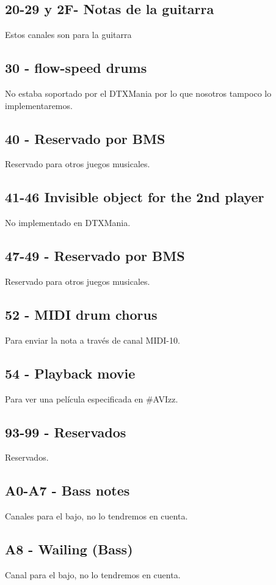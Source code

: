 \documentclass[a4paper,11pt,oneside]{book}
\begin{document}
\subsection{20-29 y 2F- Notas de la guitarra}
Estos canales son para la guitarra

\subsection{30 - flow-speed drums}
No estaba soportado por el DTXMania por lo que nosotros tampoco lo implementaremos.

\subsection{40 - Reservado por BMS}
Reservado para otros juegos musicales.

\subsection{41-46 Invisible object for the 2nd player}
No implementado en DTXMania.

\subsection{47-49 - Reservado por BMS}
Reservado para otros juegos musicales.

\subsection{52 - MIDI drum chorus}
Para enviar la nota a través de canal MIDI-10.

\subsection{54 - Playback movie}
Para ver una película especificada en \#AVIzz.


\subsection{93-99 - Reservados}
Reservados.

\subsection{A0-A7 - Bass notes}
Canales para el bajo, no lo tendremos en cuenta.

\subsection{A8 - Wailing (Bass)}
Canal para el bajo, no lo tendremos en cuenta.
\end{document}
